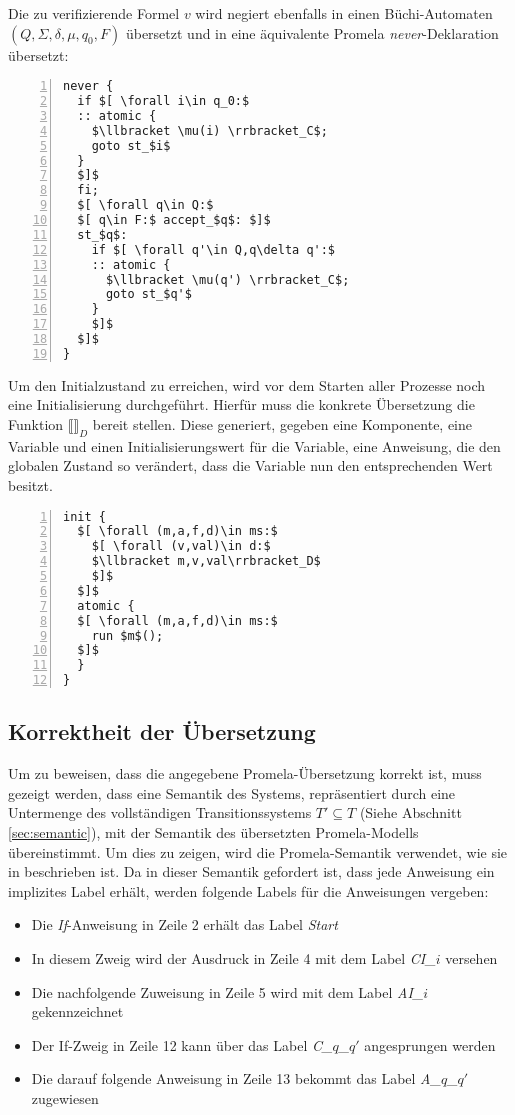 Die zu verifizierende Formel $v$ wird negiert ebenfalls in einen Büchi-Automaten $(Q,\Sigma,\delta,\mu,q_0,F)$ übersetzt und in eine äquivalente Promela \emph{never}-Deklaration übersetzt:
\begin{lstlisting}[language=Promela,mathescape=true,numbers=left,numberstyle=\small,caption={Verifikationsziel-Übersetzung als \emph{never}-Prozess}]
never {
  if $[ \forall i\in q_0:$
  :: atomic {
    $\llbracket \mu(i) \rrbracket_C$;
    goto st_$i$
  }
  $]$
  fi;
  $[ \forall q\in Q:$
  $[ q\in F:$ accept_$q$: $]$
  st_$q$:
    if $[ \forall q'\in Q,q\delta q':$
    :: atomic {
      $\llbracket \mu(q') \rrbracket_C$;
      goto st_$q'$
    }
    $]$
  $]$
}
\end{lstlisting}

Um den Initialzustand zu erreichen, wird vor dem Starten aller Prozesse noch eine Initialisierung durchgeführt.
Hierfür muss die konkrete Übersetzung die Funktion $\llbracket\rrbracket_D$ bereit stellen.
Diese generiert, gegeben eine Komponente, eine Variable und einen Initialisierungswert für die Variable, eine Anweisung, die den globalen Zustand so verändert, dass die Variable nun den entsprechenden Wert besitzt.
\begin{lstlisting}[language=Promela,mathescape=true,numbers=left,numberstyle=\small,caption={Initialisierungsprozess}]
init {
  $[ \forall (m,a,f,d)\in ms:$
    $[ \forall (v,val)\in d:$
    $\llbracket m,v,val\rrbracket_D$
    $]$
  $]$
  atomic {
  $[ \forall (m,a,f,d)\in ms:$
    run $m$();
  $]$
  }
}
\end{lstlisting}

\subsection{Korrektheit der Übersetzung}
Um zu beweisen, dass die angegebene Promela-Übersetzung korrekt ist, muss gezeigt werden, dass eine Semantik des Systems, repräsentiert durch eine Untermenge des vollständigen Transitionssystems $T'\subseteq T$ (Siehe Abschnitt \ref{sec:semantic}), mit der Semantik des übersetzten Promela-Modells übereinstimmt.
Um dies zu zeigen, wird die Promela-Semantik verwendet, wie sie in \cite{Gallardo04formalaspects} beschrieben ist.
Da in dieser Semantik gefordert ist, dass jede Anweisung ein implizites Label erhält, werden folgende Labels für die Anweisungen vergeben:
\begin{itemize}
\item Die \emph{If}-Anweisung in Zeile 2 erhält das Label \emph{Start}
\item In diesem Zweig wird der Ausdruck in Zeile 4 mit dem Label \emph{CI\_$i$} versehen
\item Die nachfolgende Zuweisung in Zeile 5 wird mit dem Label \emph{AI\_$i$} gekennzeichnet
\item Der If-Zweig in Zeile 12 kann über das Label \emph{C\_$q$\_$q'$} angesprungen werden
\item Die darauf folgende Anweisung in Zeile 13 bekommt das Label \emph{A\_$q$\_$q'$} zugewiesen
\end{itemize}

